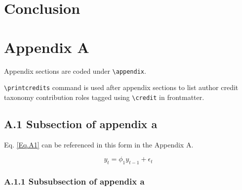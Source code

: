 \documentclass[a4paper,fleqn]{cas-dc}
\begin{document}


\section{Conclusion}

\lipsum[2]

\setcounter{equation}{0} %
\renewcommand{\theequation}{A.\arabic{equation}} %
\section*{Appendix A}
Appendix sections are coded under \verb+\appendix+.

\verb+\printcredits+ command is used after appendix sections to list 
author credit taxonomy contribution roles tagged using \verb+\credit+ 
in frontmatter.

\subsection*{A.1 Subsection of appendix a}

\lipsum[2] Eq. \eqref{Eq.A1} can be referenced in this form in the Appendix A.

\begin{equation}
y_{t} = \phi_{1} y_{t-1} + \epsilon_{t}
\label{Eq.A1}
\end{equation}

\subsubsection*{A.1.1 Subsubsection of appendix a}
\end{document}
